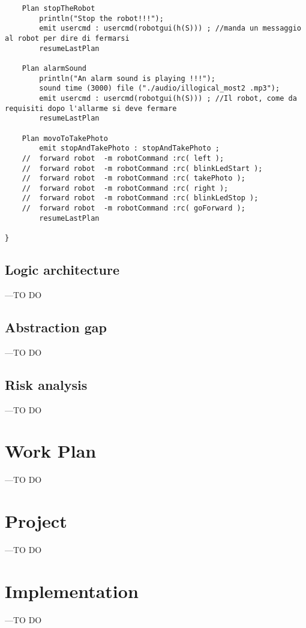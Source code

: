 \documentclass[a4paper]{article}
\begin{document}
\begin{lstlisting}
	Plan stopTheRobot
		println("Stop the robot!!!");
		emit usercmd : usercmd(robotgui(h(S))) ; //manda un messaggio al robot per dire di fermarsi
		resumeLastPlan
	
	Plan alarmSound
		println("An alarm sound is playing !!!");
		sound time (3000) file ("./audio/illogical_most2 .mp3");
		emit usercmd : usercmd(robotgui(h(S))) ; //Il robot, come da requisiti dopo l'allarme si deve fermare
		resumeLastPlan
	
	Plan movoToTakePhoto  
		emit stopAndTakePhoto : stopAndTakePhoto ;
	//	forward robot  -m robotCommand :rc( left );
	//	forward robot  -m robotCommand :rc( blinkLedStart );
	//	forward robot  -m robotCommand :rc( takePhoto );
	//	forward robot  -m robotCommand :rc( right );
	//	forward robot  -m robotCommand :rc( blinkLedStop );
	//	forward robot  -m robotCommand :rc( goForward );
		resumeLastPlan
	
}
\end{lstlisting}

\subsection{Logic architecture}
---TO DO

\subsection{Abstraction gap}
---TO DO

\subsection{Risk analysis}
---TO DO

\section{Work Plan}
---TO DO

\section{Project}
---TO DO

\section{Implementation}
---TO DO
\end{document}
